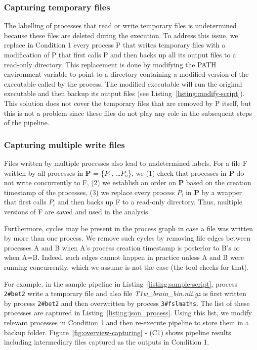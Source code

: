 \documentclass[a4paper,num-refs]{oup-contemporary}
\begin{document}
\subsubsection{Capturing temporary files} 

The labelling of processes that read or 
write temporary files is undetermined because these files are deleted during 
the execution. To address this issue, we replace in Condition 1 every process P that 
writes temporary files with a modification of P that first calls P and then
backs up all its output files to a read-only directory. This replacement is
done by modifying the PATH environment variable to point to a directory
containing a modified version of the executable called by the process. The
modified executable will run the original executable and then backup its
output files (see Listing~\ref{listing:modify-script}). 
This 
solution does not cover the temporary files that are removed by P 
itself, but this is not a problem since these files do not play any role in 
the subsequent steps of the pipeline. 

\subsubsection{Capturing multiple write files}

Files written by multiple processes also lead 
to undetermined labels. For a file F 
written by all processes in \textbf{P} = \{$P_{1}$, \ldots $P_{n}$\}, we 
(1) check that processes in \textbf{P} do not write concurrently to F, 
(2) we establish an order on \textbf{P} based on the creation timestamp 
of the processes, (3) we replace every process $P_{i}$ in \textbf{P} by 
a wrapper that first calls $P_{i}$ and then backs up F to a read-only 
directory. Thus, multiple versions of F are saved and used in the 
analysis. 

Furthermore, cycles may be present in the process graph in case a file 
was written by more than one process. We remove such cycles by removing 
file edges between processes A and B when A's process creation 
timestamp is posterior to B's or when A=B. Indeed, such edges cannot 
happen in practice unless A and B were running concurrently, which we 
assume is not the case (the tool checks for that). 

For example, in the sample pipeline in 
Listing~\ref{listing:sample-script}, process \texttt{2\#bet2} write a temporary file and 
also file \emph{T1w\_brain\_bin.nii.gz} is first written by process \texttt{2\#bet2} and 
then overwritten by process \texttt{3\#fslmaths}. The list of these processes are captured in 
Listing~\ref{listing:json_process}.
Using this list, we modify relevant processes in Condition 1 and then re-execute pipeline 
to store them in a backup folder.
Figure~\ref{fig:overview-capturing} - (C1) shows pipeline results including intermediary files 
captured as the outputs in Condition 1. 
\end{document}
